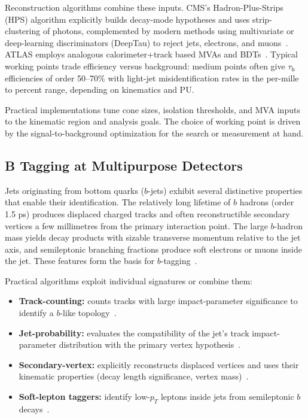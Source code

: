 Reconstruction algorithms combine these inputs. CMS's Hadron-Plus-Strips (HPS) algorithm explicitly builds decay-mode hypotheses and uses strip-clustering of photons, complemented by modern methods using multivariate or deep-learning discriminators (DeepTau)  to reject jets, electrons, and muons~\parencite{CMS:2022ydz,CMS_DeepTau}. ATLAS employs analogous calorimeter+track based MVAs and BDTs~\parencite{ATLAS:2022fgo}. Typical working points trade efficiency versus background: medium points often give $\tau_{\mathrm{h}}$ efficiencies of order 50–70\% with light-jet misidentification rates in the per-mille to percent range, depending on kinematics and PU.

Practical implementations tune cone sizes, isolation thresholds, and MVA inputs to the kinematic region and analysis goals. The choice of working point is driven by the signal-to-background optimization for the search or measurement at hand.


\subsection{B Tagging at Multipurpose Detectors}

Jets originating from bottom quarks ($b$-jets) exhibit several distinctive properties that enable their identification. The relatively long lifetime of $b$ hadrons (order 1.5 ps) produces displaced charged tracks and often reconstructible secondary vertices a few millimetres from the primary interaction point. The large $b$-hadron mass yields decay products with sizable transverse momentum relative to the jet axis, and semileptonic branching fractions produce soft electrons or muons inside the jet. These features form the basis for $b$-tagging~\cite{CMS_BTV2016}.

Practical algorithms exploit individual signatures or combine them:
\begin{itemize}
  \item \textbf{Track-counting:} counts tracks with large impact-parameter significance to identify a $b$-like topology~\cite{CMS_BTV2016}.
  \item \textbf{Jet-probability:} evaluates the compatibility of the jet's track impact-parameter distribution with the primary vertex hypothesis~\cite{CMS_BTV2016}.
  \item \textbf{Secondary-vertex:} explicitly reconstructs displaced vertices and uses their kinematic properties (decay length significance, vertex mass)~\cite{CMS_BTV2016}.
  \item \textbf{Soft-lepton taggers:} identify low-$p_T$ leptons inside jets from semileptonic $b$ decays~\cite{CMS_BTV2016}.
\end{itemize}

